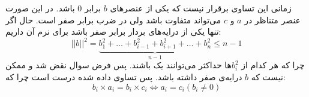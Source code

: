 
\noindent
زمانی این تساوی برقرار نیست که یکی از عنصر‌های
$b$
برابر 0 باشد. در این صورت عنصر متناظر در
$a$ و $c$
می‌تواند متفاوت باشد ولی در ضرب
برابر صفر است.
حال اگر تنها یکی از درایه‌های بردار برابر صفر باشد برای نرم آن داریم:
\begin{equation*}
    ||b||^2 = \underbrace{b_1^2 + \ldots + b_{i-1}^2 + b_{i+1}^2 + \ldots + b_{n}^2}_{n-1}
    \le n-1
\end{equation*}
چرا که هر کدام از
$b_i^2$ها
حداکثر می‌توانند یک باشند.
پس فرض سوال نقض شد و ممکن نیست که
$b$
درایه‌ی صفر داشته باشد.
پس تساوی داده شده درست است چرا که:
\begin{equation*}
b_i \times a_i = b_i \times c_i \iff a_i = c_i (b_i \neq 0)
\end{equation*}